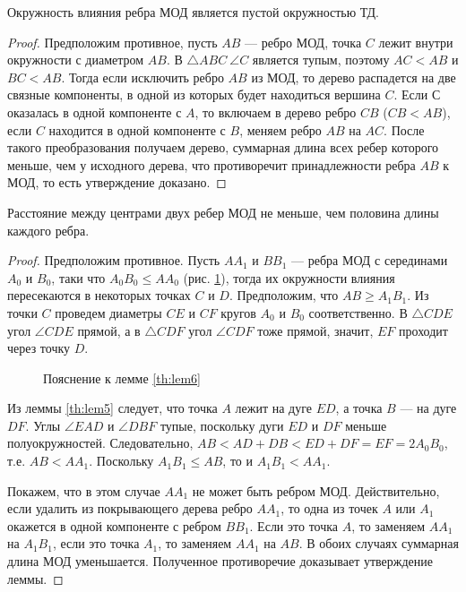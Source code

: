 \documentclass[12pt]{article}
\begin{document}
\begin{lemma}
\label{th:lem5}
Окружность влияния ребра МОД является пустой окружностью ТД.
\end{lemma}

\begin{proof}
Предположим противное, пусть $AB$ --- ребро МОД, точка $C$ лежит внутри окружности с диаметром $AB$.
В $\triangle ABC~\angle C$ является тупым, поэтому $AC < AB$ и $BC < AB$.
Тогда если исключить ребро $AB$ из МОД, то дерево распадется на две связные компоненты,
в одной из которых будет находиться вершина $C$.
Если $С$ оказалась в одной компоненте с $A$, то включаем в дерево ребро $CB$ ($CB < AB$),
если $C$ находится в одной компоненте с $B$, меняем ребро $AB$ на $AC$.
После такого преобразования получаем дерево, суммарная длина всех ребер которого меньше, чем у исходного дерева,
что противоречит принадлежности ребра $AB$ к МОД, то есть утверждение доказано.
\end{proof}

\begin{lemma}
\label{th:lem6}
Расстояние между центрами двух ребер МОД не меньше, чем половина длины каждого ребра.
\end{lemma}

\begin{proof}
Предположим противное.
Пусть $AA_1$ и $BB_1$ --- ребра МОД с серединами $A_0$ и $B_0$, таки что $A_0B_0 \le AA_0$ (рис. \ref{pic:lem6}),
тогда их окружности влияния пересекаются в некоторых точках $C$ и $D$.
Предположим, что $AB \ge A_1B_1$.
Из точки $C$ проведем диаметры $CE$ и $CF$ кругов $A_0$ и $B_0$ соответственно.
В $\triangle CDE$ угол $\angle CDE$ прямой, а в $\triangle CDF$ угол $\angle CDF$ тоже прямой,
значит, $EF$ проходит через точку $D$.

\begin{figure}[htb!]
	\caption{Пояснение к лемме \ref{th:lem6}}
	\label{pic:lem6}
\end{figure}

Из леммы \ref{th:lem5} следует, что точка $A$ лежит на дуге $ED$, а точка $B$ --- на дуге $DF$.
Углы $\angle EAD$ и $\angle DBF$ тупые, поскольку дуги $ED$ и $DF$ меньше полуокружностей.
Следовательно, $AB < AD + DB < ED + DF = EF = 2A_0B_0$, т.е. $AB < AA_1$.
Поскольку $A_1B_1 \le AB$, то и $A_1B_1 < AA_1$.

Покажем, что в этом случае $AA_1$ не может быть ребром МОД.
Действительно, если удалить из покрывающего дерева ребро $AA_1$,
то одна из точек $A$ или $A_1$ окажется в одной компоненте с ребром $BB_1$.
Если это точка $A$, то заменяем $AA_1$ на $A_1B_1$,
если это точка $A_1$, то заменяем $AA_1$ на $AB$.
В обоих случаях суммарная длина МОД уменьшается.
Полученное противоречие доказывает утверждение леммы. 
\end{proof}
\end{document}
